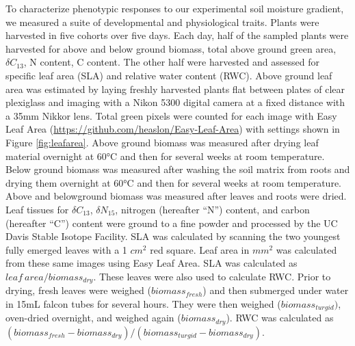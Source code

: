 \documentclass[jou,floatsintext]{apa6}
\begin{document}
To characterize phenotypic responses to our experimental soil moisture gradient, we measured a suite of developmental and physiological traits. Plants were harvested in five cohorts over five days. Each day, half of the sampled plants were harvested for above and below ground biomass, total above ground green area, \(\delta C_{13}\), N content, C content. The other half were harvested and assessed for specific leaf area (SLA) and relative water content (RWC). Above ground leaf area was estimated by laying freshly harvested plants flat between plates of clear plexiglass and imaging with a Nikon 5300 digital camera at a fixed distance with a 35mm Nikkor lens. Total green pixels were counted for each image with Easy Leaf Area (\url{https://github.com/heaslon/Easy-Leaf-Area}) with settings shown in Figure \ref{fig:leafarea}. Above ground biomass was measured after drying leaf material overnight at 60°C and then for several weeks at room temperature. Below ground biomass was measured after washing the soil matrix from roots and drying them overnight at 60°C and then for several weeks at room temperature. Above and belowground biomass was measured after leaves and roots were dried. Leaf tissues for \(\delta C_{13}\), \(\delta N_{15}\), nitrogen (hereafter \enquote{N}) content, and carbon (hereafter \enquote{C}) content were ground to a fine powder and processed by the UC Davis Stable Isotope Facility. SLA was calculated by scanning the two youngest fully emerged leaves with a 1 \(cm^2\) red square. Leaf area in \(mm^2\) was calculated from these same images using Easy Leaf Area. SLA was calculated as \(leaf\ area / biomass_{dry}\). These leaves were also used to calculate RWC. Prior to drying, fresh leaves were weighed (\(biomass_{fresh}\)) and then submerged under water in 15mL falcon tubes for several hours. They were then weighed (\(biomass_{turgid})\), oven-dried overnight, and weighed again (\(biomass_{dry}\)). RWC was calculated as \((biomass_{fresh}-biomass_{dry})/(biomass_{turgid}-biomass_{dry})\).
\end{document}
